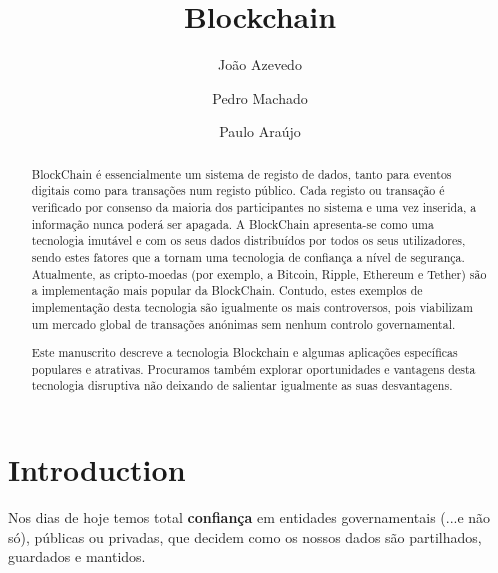 \documentclass{llncs}
\begin{document}
\mainmatter
\title{Blockchain}


\author{João Azevedo \and Pedro Machado \and Paulo Araújo}



\date{}


\maketitle
\begin{abstract}
BlockChain é essencialmente um sistema de registo de dados, tanto para eventos digitais como para transações num registo público. Cada registo ou transação é verificado por consenso da maioria dos participantes no sistema e uma vez inserida, a informação nunca poderá ser apagada. A BlockChain apresenta-se como uma tecnologia imutável e com os seus dados distribuídos por todos os seus utilizadores, sendo estes fatores que a tornam uma tecnologia de confiança a nível de segurança.
Atualmente, as cripto-moedas (por exemplo, a Bitcoin, Ripple, Ethereum e Tether) são a implementação mais popular da BlockChain. Contudo, estes exemplos de implementação desta tecnologia são igualmente os mais controversos, pois viabilizam um mercado global de transações anónimas sem nenhum controlo governamental.
  
Este manuscrito descreve a tecnologia Blockchain e algumas aplicações específicas populares e atrativas. Procuramos também explorar oportunidades e vantagens desta tecnologia disruptiva não deixando de salientar igualmente as suas desvantagens. 


\end{abstract}

\section{Introduction}


Nos dias de hoje temos total \textbf{confiança} em entidades governamentais (...e não só), públicas ou privadas, que decidem como os nossos dados são partilhados, guardados e mantidos. \par 
\end{document}
